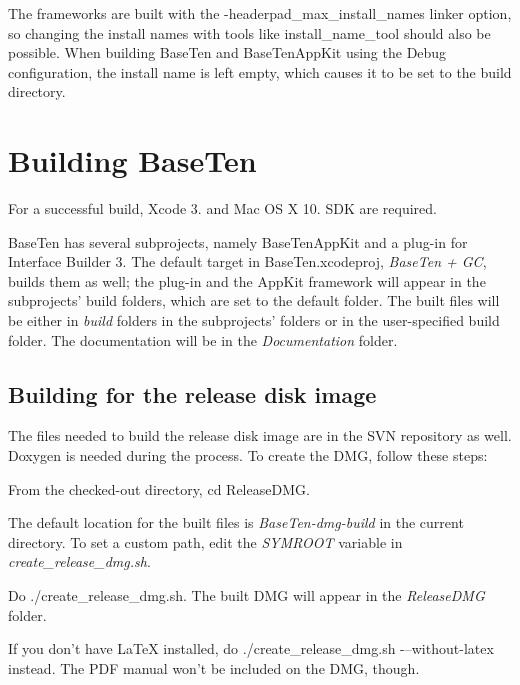 The frameworks are built with the -\/headerpad\+\_\+max\+\_\+install\+\_\+names linker option, so changing the install names with tools like install\+\_\+name\+\_\+tool should also be possible. When building Base\+Ten and Base\+Ten\+App\+Kit using the Debug configuration, the install name is left empty, which causes it to be set to the build directory. \hypertarget{building_baseten}{}\section{Building Base\+Ten}\label{building_baseten}
For a successful build, Xcode 3. and Mac O\+S X 10. S\+D\+K are required.

Base\+Ten has several subprojects, namely Base\+Ten\+App\+Kit and a plug-\/in for Interface Builder 3. The default target in Base\+Ten.\+xcodeproj, {\itshape Base\+Ten + G\+C}, builds them as well; the plug-\/in and the App\+Kit framework will appear in the subprojects' build folders, which are set to the default folder. The built files will be either in {\itshape build} folders in the subprojects' folders or in the user-\/specified build folder. The documentation will be in the {\itshape Documentation} folder.\hypertarget{building_baseten_building_for_the_release_dmg}{}\subsection{Building for the release disk image}\label{building_baseten_building_for_the_release_dmg}
The files needed to build the release disk image are in the S\+V\+N repository as well. Doxygen is needed during the process. To create the D\+M\+G, follow these steps\+: 
\begin{DoxyEnumerate}
\item From the checked-\/out directory, {\ttfamily cd Release\+D\+M\+G}. 
\item The default location for the built files is {\itshape Base\+Ten-\/dmg-\/build} in the current directory. To set a custom path, edit the {\itshape S\+Y\+M\+R\+O\+O\+T} variable in {\itshape create\+\_\+release\+\_\+dmg.\+sh}. 
\item Do {\ttfamily ./create\+\_\+release\+\_\+dmg.sh}. The built D\+M\+G will appear in the {\itshape Release\+D\+M\+G} folder. 
\begin{DoxyItemize}
\item If you don't have La\+Te\+X installed, do {\ttfamily ./create\+\_\+release\+\_\+dmg.sh -\/--without-\/latex} instead. The P\+D\+F manual won't be included on the D\+M\+G, though. 
\end{DoxyItemize}
\end{DoxyEnumerate}